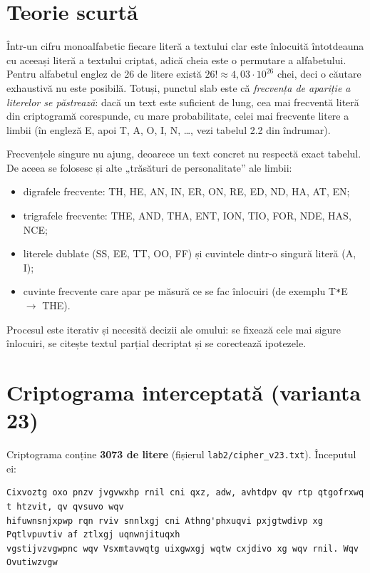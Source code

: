 \documentclass[12pt,a4paper]{article}
\newcommand{\code}[1]{\texttt{\small #1}}
\begin{document}
\section{Teorie scurtă}

Într-un cifru monoalfabetic fiecare literă a textului clar este înlocuită întotdeauna
cu aceeași literă a textului criptat, adică cheia este o permutare a alfabetului. Pentru
alfabetul englez de 26 de litere există $26! \approx 4{,}03\cdot10^{26}$ chei, deci o căutare
exhaustivă nu este posibilă. Totuși, punctul slab este că \emph{frecvența de apariție a
literelor se păstrează}: dacă un text este suficient de lung, cea mai frecventă literă din
criptogramă corespunde, cu mare probabilitate, celei mai frecvente litere a limbii
(în engleză E, apoi T, A, O, I, N, \dots, vezi tabelul 2.2 din îndrumar).

Frecvențele singure nu ajung, deoarece un text concret nu respectă exact tabelul.
De aceea se folosesc și alte „trăsături de personalitate” ale limbii:
\begin{itemize}
  \item digrafele frecvente: TH, HE, AN, IN, ER, ON, RE, ED, ND, HA, AT, EN;
  \item trigrafele frecvente: THE, AND, THA, ENT, ION, TIO, FOR, NDE, HAS, NCE;
  \item literele dublate (SS, EE, TT, OO, FF) și cuvintele dintr-o singură literă (A, I);
  \item cuvinte frecvente care apar pe măsură ce se fac înlocuiri (de exemplu T\texttt{*}E $\to$ THE).
\end{itemize}
Procesul este iterativ și necesită decizii ale omului: se fixează cele mai sigure
înlocuiri, se citește textul parțial decriptat și se corectează ipotezele.

\section{Criptograma interceptată (varianta 23)}

Criptograma conține \textbf{3073 de litere} (fișierul \code{lab2/cipher\_v23.txt}). Începutul ei:
\begin{lstlisting}[language={}]
Cixvoztg oxo pnzv jvgvwxhp rnil cni qxz, adw, avhtdpv qv rtp qtgofrxwq t htzvit, qv qvsuvo wqv
hifuwnsnjxpwp rqn rviv snnlxgj cni Athng'phxuqvi pxjgtwdivp xg Pqtlvpuvtiv af ztlxgj uqnwnjituqxh
vgstijvzvgwpnc wqv Vsxmtavwqtg uixgwxgj wqtw cxjdivo xg wqv rnil. Wqv Ovutiwzvgw
\end{lstlisting}
\end{document}
